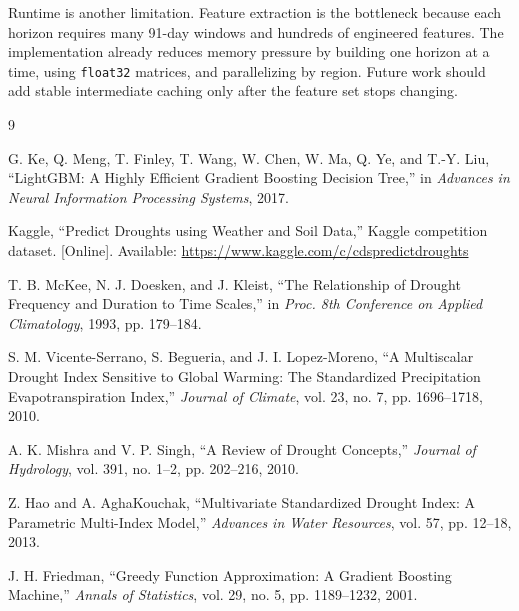\documentclass[conference]{IEEEtran}
\begin{document}
Runtime is another limitation. Feature extraction is the bottleneck because each
horizon requires many 91-day windows and hundreds of engineered features. The
implementation already reduces memory pressure by building one horizon at a
time, using \texttt{float32} matrices, and parallelizing by region. Future work
should add stable intermediate caching only after the feature set stops changing.

\begin{thebibliography}{9}

G. Ke, Q. Meng, T. Finley, T. Wang, W. Chen, W. Ma, Q. Ye, and T.-Y. Liu,
``LightGBM: A Highly Efficient Gradient Boosting Decision Tree,'' in
\emph{Advances in Neural Information Processing Systems}, 2017.

Kaggle, ``Predict Droughts using Weather and Soil Data,'' Kaggle competition
dataset. [Online]. Available:
\url{https://www.kaggle.com/c/cdspredictdroughts}

T. B. McKee, N. J. Doesken, and J. Kleist, ``The Relationship of Drought
Frequency and Duration to Time Scales,'' in \emph{Proc. 8th Conference on
Applied Climatology}, 1993, pp. 179--184.

S. M. Vicente-Serrano, S. Begueria, and J. I. Lopez-Moreno, ``A Multiscalar
Drought Index Sensitive to Global Warming: The Standardized Precipitation
Evapotranspiration Index,'' \emph{Journal of Climate}, vol. 23, no. 7,
pp. 1696--1718, 2010.

A. K. Mishra and V. P. Singh, ``A Review of Drought Concepts,''
\emph{Journal of Hydrology}, vol. 391, no. 1--2, pp. 202--216, 2010.

Z. Hao and A. AghaKouchak, ``Multivariate Standardized Drought Index: A
Parametric Multi-Index Model,'' \emph{Advances in Water Resources}, vol. 57,
pp. 12--18, 2013.

J. H. Friedman, ``Greedy Function Approximation: A Gradient Boosting Machine,''
\emph{Annals of Statistics}, vol. 29, no. 5, pp. 1189--1232, 2001.

\end{thebibliography}
\end{document}
